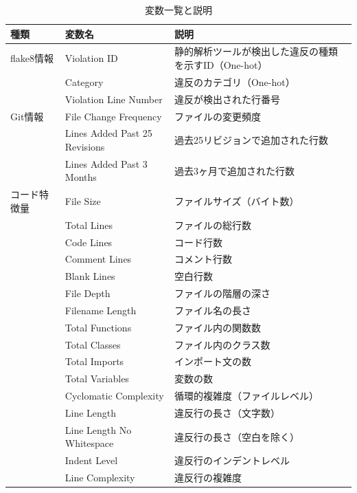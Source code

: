 \documentclass[11pt]{jreport}
\begin{document}
\begin{table}[ht]
    \centering
    \small %
    \renewcommand{\arraystretch}{1.1} %
    \setlength{\tabcolsep}{4pt} %
    \caption{変数一覧と説明}
    \label{tab:variables}
    \begin{tabularx}{\textwidth}{llX} %
        \toprule
        種類 & 変数名 & 説明 \\
        \midrule
        flake8情報 & Violation ID & 静的解析ツールが検出した違反の種類を示すID（One-hot） \\
        & Category & 違反のカテゴリ（One-hot） \\
        & Violation Line Number & 違反が検出された行番号 \\
        \midrule
        Git情報 & File Change Frequency & ファイルの変更頻度 \\
        & Lines Added Past 25 Revisions & 過去25リビジョンで追加された行数 \\
        & Lines Added Past 3 Months & 過去3ヶ月で追加された行数 \\
        \midrule
        コード特徴量 & File Size & ファイルサイズ（バイト数） \\
        & Total Lines & ファイルの総行数 \\
        & Code Lines & コード行数 \\
        & Comment Lines & コメント行数 \\
        & Blank Lines & 空白行数 \\
        & File Depth & ファイルの階層の深さ \\
        & Filename Length & ファイル名の長さ \\
        & Total Functions & ファイル内の関数数 \\
        & Total Classes & ファイル内のクラス数 \\
        & Total Imports & インポート文の数 \\
        & Total Variables & 変数の数 \\
        & Cyclomatic Complexity & 循環的複雑度（ファイルレベル） \\
        & Line Length & 違反行の長さ（文字数） \\
        & Line Length No Whitespace & 違反行の長さ（空白を除く） \\
        & Indent Level & 違反行のインデントレベル \\
        & Line Complexity & 違反行の複雑度 \\

\end{tabularx}
\end{table}
\end{document}
